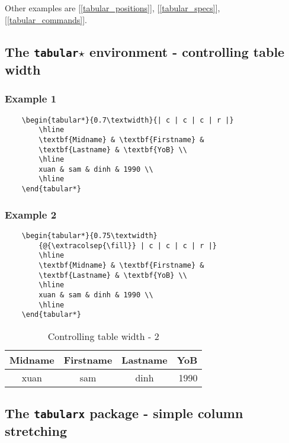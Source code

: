 \documentclass[11pt,a4paper]{article}
\begin{document}
\subparagraph{} Other examples are [\ref{tabular_positions}], [\ref{tabular_specs}], [\ref{tabular_commands}].

\subsection[\texttt{tabular$\star$}]{The \texttt{tabular$\star$} environment - controlling table width}
\subsubsection{Example 1}
\begin{verbatim}
	\begin{tabular*}{0.7\textwidth}{| c | c | c | r |}
		\hline
		\textbf{Midname} & \textbf{Firstname} &
		\textbf{Lastname} & \textbf{YoB} \\
		\hline
		xuan & sam & dinh & 1990 \\
		\hline
	\end{tabular*}
\end{verbatim}
\subsubsection{Example 2}


\begin{verbatim}
	\begin{tabular*}{0.75\textwidth}
		{@{\extracolsep{\fill}} | c | c | c | r |}
		\hline
		\textbf{Midname} & \textbf{Firstname} &
		\textbf{Lastname} & \textbf{YoB} \\
		\hline
		xuan & sam & dinh & 1990 \\
		\hline
	\end{tabular*}
\end{verbatim}



\begin{table}[htbp]
	\centering
	\begin{tabular*}{0.75\textwidth}{@{\extracolsep{\fill}} | c | c | c | r |}
		\hline
		\textbf{Midname} & \textbf{Firstname} & \textbf{Lastname} & \textbf{YoB} \\
		\hline
		xuan & sam & dinh & 1990 \\
		\hline
	\end{tabular*}
	\caption{Controlling table width - 2}
	\label{tableWidth2}
\end{table}

\subsection[\texttt{tabularx} package]{The \texttt{tabularx} package - simple column stretching}
\end{document}
